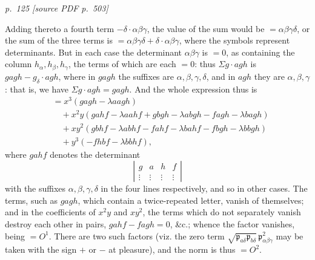 \documentclass[11pt,a4paper]{article}
\newcommand{\sourcepage}[2]{%
  \bigskip
  \noindent\textit{p.~#1 [source PDF p.~#2]}%
  \par\smallskip
}
\newcommand{\p}{\mathfrak p}
\newcommand{\sym}[1]{\mathit{#1}}
\begin{document}
\sourcepage{125}{503}
Adding thereto a fourth term $-\delta\cdot\alpha\beta\gamma$, the value of the sum
would be $=\alpha\beta\gamma\delta$, or the sum of the three terms is
$=\alpha\beta\gamma\delta+\delta\cdot\alpha\beta\gamma$, where the symbols
represent determinants. But in each case the determinant $\alpha\beta\gamma$ is
$=0$, as containing the column $h_\alpha,h_\beta,h_\gamma$, the terms of which are
each $=0$: thus $\Sigma g\cdot agh$ is
$gagh-g_\delta\cdot agh$, where in $gagh$ the suffixes are
$\alpha,\beta,\gamma,\delta$, and in $agh$ they are $\alpha,\beta,\gamma$: that is,
we have $\Sigma g\cdot agh=gagh$. And the whole expression thus is
\[
\begin{aligned}
&=x^3(\sym{gagh}-\lambda\sym{aagh})\\
&\quad+x^2y(\sym{gahf}-\lambda\sym{aahf}
      +\sym{gbgh}-\lambda\sym{abgh}
      -\sym{fagh}-\lambda\sym{bagh})\\
&\quad+xy^2(\sym{gbhf}-\lambda\sym{abhf}
      -\sym{fahf}-\lambda\sym{bahf}
      -\sym{fbgh}-\lambda\sym{bbgh})\\
&\quad+y^3(-\sym{fhbf}-\lambda\sym{bbhf}),
\end{aligned}
\]
where $\sym{gahf}$ denotes the determinant
\[
\left|\begin{array}{cccc}
g&a&h&f\\
\vdots&\vdots&\vdots&\vdots
\end{array}\right|
\]
with the suffixes $\alpha,\beta,\gamma,\delta$ in the four lines respectively, and
so in other cases. The terms, such as $\sym{gagh}$, which contain a twice-repeated
letter, vanish of themselves; and in the coefficients of $x^2y$ and $xy^2$, the
terms which do not separately vanish destroy each other in pairs,
$\sym{gahf}-\sym{fagh}=0$, \&c.; whence the factor vanishes, being $=O^1$.
There are two such factors (viz. the zero term
$\sqrt{\p_{a\delta}\p_{b\delta}}\,\p^2_{\alpha\beta\gamma}$ may be taken with the
sign $+$ or $-$ at pleasure), and the norm is thus $=O^2$.
\end{document}
